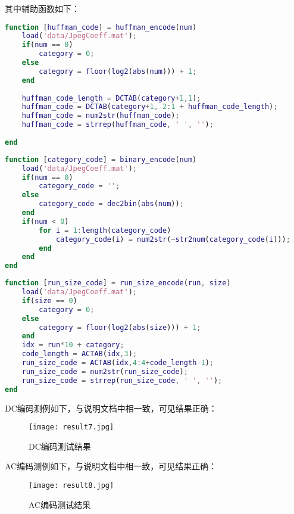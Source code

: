 \documentclass[a4paper]{article}
\begin{document}
\par 其中辅助函数如下：
\begin{lstlisting}[language=matlab, caption=huffman encode]
function [huffman_code] = huffman_encode(num)
    load('data/JpegCoeff.mat');
    if(num == 0)
        category = 0;
    else
        category = floor(log2(abs(num))) + 1;
    end
    
    huffman_code_length = DCTAB(category+1,1);
    huffman_code = DCTAB(category+1, 2:1 + huffman_code_length);
    huffman_code = num2str(huffman_code);
    huffman_code = strrep(huffman_code, ' ', '');
    
end
\end{lstlisting}

\begin{lstlisting}[language=matlab, caption=binary encode]
function [category_code] = binary_encode(num)
    load('data/JpegCoeff.mat');
    if(num == 0)
        category_code = '';
    else
        category_code = dec2bin(abs(num));
    end
    if(num < 0)
        for i = 1:length(category_code)
            category_code(i) = num2str(~str2num(category_code(i)));
        end
    end
end
\end{lstlisting}

\begin{lstlisting}[language=matlab, caption=run/size encode]
function [run_size_code] = run_size_encode(run, size)
    load('data/JpegCoeff.mat');
    if(size == 0)
        category = 0;
    else
        category = floor(log2(abs(size))) + 1;
    end
    idx = run*10 + category;
    code_length = ACTAB(idx,3);
    run_size_code = ACTAB(idx,4:4+code_length-1);
    run_size_code = num2str(run_size_code);
    run_size_code = strrep(run_size_code, ' ', '');
end
\end{lstlisting}

\par DC编码测例如下，与说明文档中相一致，可见结果正确：
\begin{figure}[ht]
     \centering
     \texttt{[image: result7.jpg]}
     \caption{DC编码测试结果}
    \label{fig:result 7}
\end{figure}

\par AC编码测例如下，与说明文档中相一致，可见结果正确：
\begin{figure}[ht]
     \centering
     \texttt{[image: result8.jpg]}
     \caption{AC编码测试结果}
    \label{fig:result 8}
\end{figure}
\end{document}
